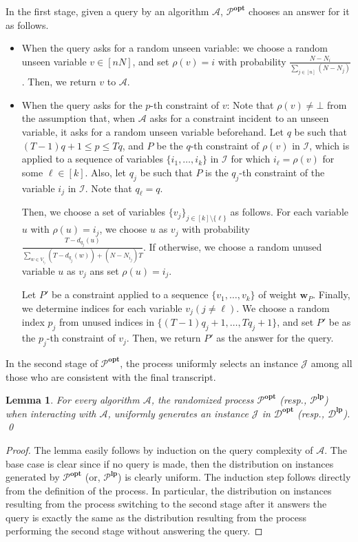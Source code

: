 \documentclass[letterpaper, 11pt]{article}
\newtheorem{lemma}[theorem]{Lemma}
\newcommand{\calA}{\mathcal{A}}
\newcommand{\calD}{\mathcal{D}}
\newcommand{\calI}{\mathcal{I}}
\newcommand{\calJ}{\mathcal{J}}
\newcommand{\calP}{\mathcal{P}}
\newcommand{\biw}{\boldsymbol{w}}
\newcommand{\lp}{\mathbf{lp}}
\newcommand{\opt}{\mathbf{opt}}
\begin{document}
In the first stage,
given a query by an algorithm $\calA$, 
$\calP^{\opt}$ chooses an answer for it as follows.
\begin{itemize}
\setlength{\itemsep}{0pt}
\item When the query asks for a random unseen variable: 
  we choose a random unseen variable $v \in [nN]$, 
  and set $\rho(v) = i$ with probability $\frac{N-N_i}{\sum_{j\in [n]} (N-N_j)}$.
  Then, we return $v$ to $\calA$.
\item When the query asks for the $p$-th constraint of $v$:
  Note that $\rho(v) \neq \bot$ from the assumption that, when $\calA$ asks for a constraint incident to an unseen variable, it asks for a random unseen variable beforehand.
  Let $q$ be such that $(T-1)q+1 \leq p \leq Tq$, and $P$ be the $q$-th constraint of $\rho(v)$ in $\calI$,
  which is applied to a sequence of variables $\{i_1,\ldots,i_k\}$ in $\calI$ for which $i_\ell = \rho(v)$ for some $\ell \in [k]$.
  Also, let $q_j$ be such that $P$ is the $q_j$-th constraint of the variable $i_j$ in $\calI$.
  Note that $q_\ell = q$.
  
  Then, we choose a set of variables $\{v_j\}_{j \in [k] \setminus \{\ell\}}$ as follows.
  For each variable $u$ with $\rho(u)=i_j$,
  we choose $u$ as $v_j$ with probability $\frac{T-d_{q_j}(u)}{\sum_{w\in V_{i_j}}(T-d_{q_j}(w)) + (N-{N_{i_j}})T}$.
  If otherwise, we choose a random unused variable $u$ as $v_j$ ans set $\rho(u)=i_j$.

  Let $P'$ be a constraint applied to a sequence $\{v_1,\ldots,v_k\}$ of weight $\biw_{P}$.
  Finally, we determine indices for each variable $v_j (j \neq \ell)$.
  We choose a random index $p_j$ from unused indices in $\{(T-1)q_j+1,\ldots,Tq_j+1\}$,
  and set $P'$ be as the $p_j$-th constraint of $v_j$.
  Then, we return $P'$ as the answer for the query.
\end{itemize}
In the second stage of $\calP^{\opt}$, 
the process uniformly selects an instance $\calJ$ among all those who are consistent with the final transcript.

\begin{lemma}\label{lmm:equivalent}
  For every algorithm $\calA$, 
  the randomized process $\calP^{\opt}$ (resp., $\calP^{\lp}$) when interacting with $\calA$, 
  uniformly generates an instance $\calJ$ in $\calD^{\opt}$ (resp., $\calD^{\lp}$).
  \qed
\end{lemma}
\begin{proof}
  The lemma easily follows by induction on the query complexity of $\calA$.
  The base case is clear since if no query is made, 
  then the distribution on instances generated by $\calP^{\opt}$ (or, $\calP^{\lp}$) is clearly uniform.
  The induction step follows directly from the definition of the process.
  In particular, 
  the distribution on instances resulting from the process switching to the second stage after it answers the query is exactly the same as the distribution resulting from the process performing the second stage without answering the query.
\end{proof}
\end{document}
